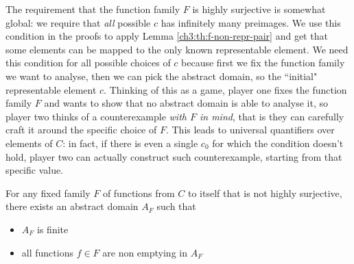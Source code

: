 The requirement that the function family $F$ is highly surjective is somewhat global: we require that \textit{all} possible $c$ has infinitely many preimages.
We use this condition in the proofs to apply Lemma \ref{ch3:th:f-non-repr-pair} and get that some elements can be mapped to the only known representable element. We need this condition for all possible choices of $c$ because first we fix the function family we want to analyse, then we can pick the abstract domain, so the ``initial" representable element $c$.
Thinking of this as a game, player one fixes the function family $F$ and wants to show that no abstract domain is able to analyse it, so player two thinks of a counterexample \textit{with $F$ in mind}, that is they can carefully craft it around the specific choice of $F$. This leads to universal quantifiers over elements of $C$: in fact, if there is even a single $c_0$ for which the condition doesn't hold, player two can actually construct such counterexample, starting from that specific value.
\begin{prop}\label{ch4:th:no-higly-onto-domain-construction}
	For any fixed family $F$ of functions from $C$ to itself that is not highly surjective, there exists an abstract domain $A_F$ such that
	\begin{itemize}
		\item $A_F$ is finite
		\item all functions $f \in F$ are non emptying in $A_F$
	\end{itemize}
\end{prop}
